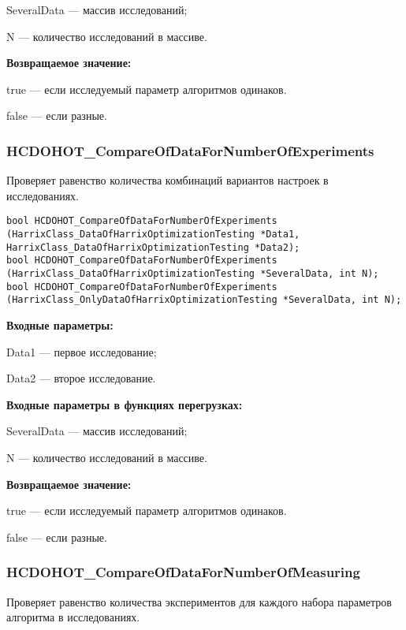 \documentclass[a4paper,12pt]{article}
\begin{document}
SeveralData --- массив исследований;

N --- количество исследований в массиве.

\textbf{Возвращаемое значение:}

true --- если исследуемый параметр алгоритмов одинаков.

false --- если разные.


\subsubsection{HCDOHOT\_CompareOfDataForNumberOfExperiments}\label{HCDOHOT_CompareOfDataForNumberOfExperiments}

Проверяет равенство количества комбинаций вариантов настроек в исследованиях.


\begin{lstlisting}[label=code_syntax_HCDOHOT_CompareOfDataForNumberOfExperiments,caption=Синтаксис]
bool HCDOHOT_CompareOfDataForNumberOfExperiments (HarrixClass_DataOfHarrixOptimizationTesting *Data1, HarrixClass_DataOfHarrixOptimizationTesting *Data2);
bool HCDOHOT_CompareOfDataForNumberOfExperiments (HarrixClass_DataOfHarrixOptimizationTesting *SeveralData, int N);
bool HCDOHOT_CompareOfDataForNumberOfExperiments (HarrixClass_OnlyDataOfHarrixOptimizationTesting *SeveralData, int N);
\end{lstlisting}

\textbf{Входные параметры:}

Data1 --- первое исследование;

Data2 --- второе исследование.

\textbf{Входные параметры в функциях перегрузках:}

SeveralData --- массив исследований;

N --- количество исследований в массиве.

\textbf{Возвращаемое значение:}

true --- если исследуемый параметр алгоритмов одинаков.

false --- если разные.


\subsubsection{HCDOHOT\_CompareOfDataForNumberOfMeasuring}\label{HCDOHOT_CompareOfDataForNumberOfMeasuring}

Проверяет равенство количества экспериментов для каждого набора параметров алгоритма в исследованиях.
\end{document}
